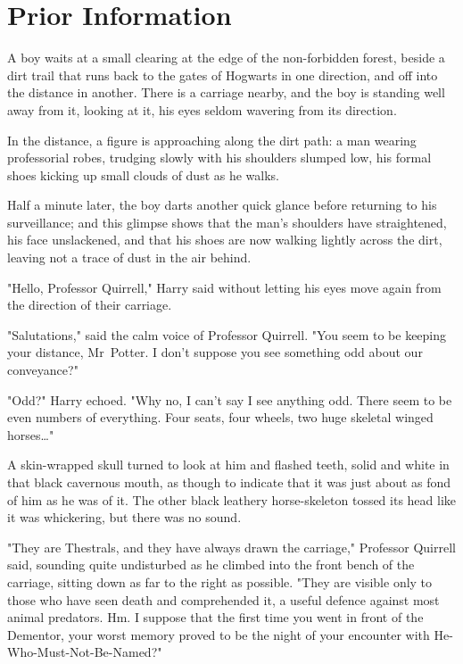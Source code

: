 \chapter{Prior Information}

\lettrine{A}{} boy waits at a
small clearing at the edge of the non-forbidden forest, beside a dirt trail
that runs back to the gates of Hogwarts in one direction, and off into the
distance in another. There is a carriage nearby, and the boy is standing well
away from it, looking at it, his eyes seldom wavering from its direction.

In the distance, a figure is approaching along the dirt path: a man wearing
professorial robes, trudging slowly with his shoulders slumped low, his formal
shoes kicking up small clouds of dust as he walks.

Half a minute later, the boy darts another quick glance before returning to his
surveillance; and this glimpse shows that the man's shoulders have
straightened, his face unslackened, and that his shoes are now walking lightly
across the dirt, leaving not a trace of dust in the air behind.

"Hello, Professor Quirrell," Harry said without letting his eyes move again
from the direction of their carriage.

"Salutations," said the calm voice of Professor Quirrell. "You seem to be
keeping your distance, Mr~Potter. I don't suppose you see something odd about
our conveyance?"

"Odd?" Harry echoed. "Why no, I can't say I see anything odd. There seem to be
even numbers of everything. Four seats, four wheels, two huge skeletal winged
horses…"

A skin-wrapped skull turned to look at him and flashed teeth, solid and white
in that black cavernous mouth, as though to indicate that it was just about as
fond of him as he was of it. The other black leathery horse-skeleton tossed its
head like it was whickering, but there was no sound.

"They are Thestrals, and they have always drawn the carriage," Professor
Quirrell said, sounding quite undisturbed as he climbed into the front bench of
the carriage, sitting down as far to the right as possible. "They are visible
only to those who have seen death and comprehended it, a useful defence against
most animal predators. Hm. I suppose that the first time you went in front of
the Dementor, your worst memory proved to be the night of your encounter with
He-Who-Must-Not-Be-Named?"

